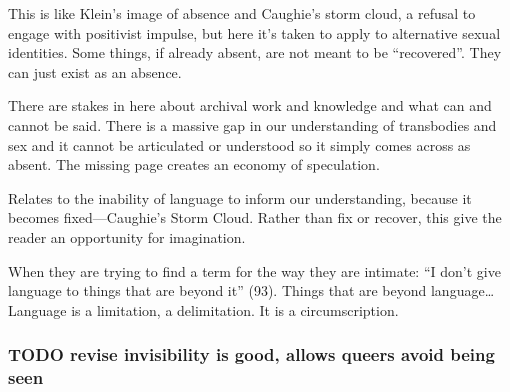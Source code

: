 \documentclass[11pt]{article}
\begin{document}
This is like Klein's image of absence and Caughie's storm cloud, a refusal to engage with positivist impulse, but here it's taken to apply to alternative sexual identities. Some things, if already absent, are not meant to be “recovered”. They can just exist as an absence.

There are stakes in here about archival work and knowledge and what can and cannot be said. There is a massive gap in our understanding of transbodies and sex and it cannot be articulated or understood so it simply comes across as absent. The missing page creates an economy of speculation.

Relates to the inability of language to inform our understanding, because it becomes fixed---Caughie’s Storm Cloud. Rather than fix or recover, this give the reader an opportunity for imagination.

When they are trying to find a term for the way they are intimate: “I
don’t give language to things that are beyond it” (93). Things that are beyond language\ldots{} Language is a limitation, a delimitation. It is a circumscription.

\subsubsection{{\bfseries\sffamily TODO} revise invisibility is good, allows queers avoid being seen}
\label{sec:org12d7e1a}
\end{document}
